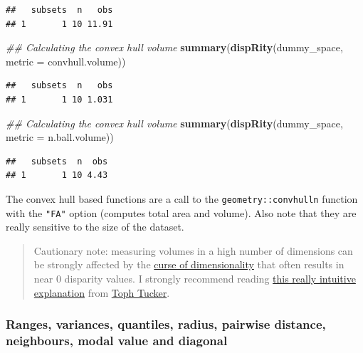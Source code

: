 \documentclass[
]{book}
\newenvironment{Shaded}{\begin{snugshade}}{\end{snugshade}}
\newcommand{\CommentTok}[1]{\textcolor[rgb]{0.56,0.35,0.01}{\textit{#1}}}
\newcommand{\DataTypeTok}[1]{\textcolor[rgb]{0.13,0.29,0.53}{#1}}
\newcommand{\KeywordTok}[1]{\textcolor[rgb]{0.13,0.29,0.53}{\textbf{#1}}}
\newcommand{\NormalTok}[1]{#1}
\begin{document}
\begin{verbatim}
##   subsets  n   obs
## 1       1 10 11.91
\end{verbatim}

\begin{Shaded}
\begin{Highlighting}[]
\CommentTok{\#\# Calculating the convex hull volume}
\KeywordTok{summary}\NormalTok{(}\KeywordTok{dispRity}\NormalTok{(dummy\_space, }\DataTypeTok{metric =}\NormalTok{ convhull.volume))}
\end{Highlighting}
\end{Shaded}

\begin{verbatim}
##   subsets  n   obs
## 1       1 10 1.031
\end{verbatim}

\begin{Shaded}
\begin{Highlighting}[]
\CommentTok{\#\# Calculating the convex hull volume}
\KeywordTok{summary}\NormalTok{(}\KeywordTok{dispRity}\NormalTok{(dummy\_space, }\DataTypeTok{metric =}\NormalTok{ n.ball.volume))}
\end{Highlighting}
\end{Shaded}

\begin{verbatim}
##   subsets  n  obs
## 1       1 10 4.43
\end{verbatim}

The convex hull based functions are a call to the \texttt{geometry::convhulln} function with the \texttt{"FA"} option (computes total area and volume).
Also note that they are really sensitive to the size of the dataset.

\begin{quote}
Cautionary note: measuring volumes in a high number of dimensions can be strongly affected by the \href{https://en.wikipedia.org/wiki/Curse_of_dimensionality}{curse of dimensionality} that often results in near 0 disparity values. I strongly recommend reading \href{https://beta.observablehq.com/@tophtucker/theres-plenty-of-room-in-the-corners}{this really intuitive explanation} from \href{https://github.com/tophtucker}{Toph Tucker}.
\end{quote}

\hypertarget{ranges-variances-quantiles-radius-pairwise-distance-neighbours-modal-value-and-diagonal}{%
\subsubsection{Ranges, variances, quantiles, radius, pairwise distance, neighbours, modal value and diagonal}\label{ranges-variances-quantiles-radius-pairwise-distance-neighbours-modal-value-and-diagonal}}
\end{document}
